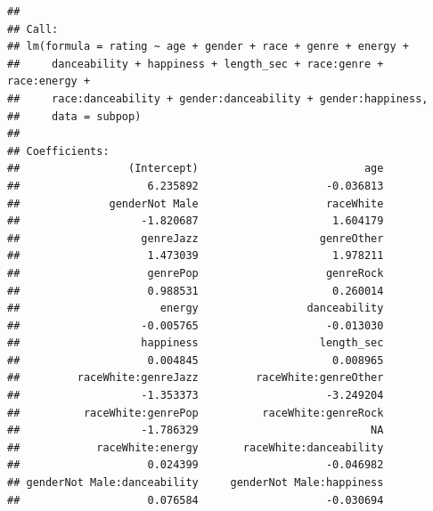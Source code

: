 \documentclass[
]{article}
\newenvironment{Shaded}{\begin{snugshade}}{\end{snugshade}}
\newcommand{\NormalTok}[1]{#1}
\newcommand{\OtherTok}[1]{\textcolor[rgb]{0.56,0.35,0.01}{#1}}
\newcommand{\SpecialCharTok}[1]{\textcolor[rgb]{0.81,0.36,0.00}{\textbf{#1}}}
\newcommand{\StringTok}[1]{\textcolor[rgb]{0.31,0.60,0.02}{#1}}
\begin{document}
\begin{Shaded}
\end{Shaded}

\begin{verbatim}
## 
## Call:
## lm(formula = rating ~ age + gender + race + genre + energy + 
##     danceability + happiness + length_sec + race:genre + race:energy + 
##     race:danceability + gender:danceability + gender:happiness, 
##     data = subpop)
## 
## Coefficients:
##                 (Intercept)                          age  
##                    6.235892                    -0.036813  
##              genderNot Male                    raceWhite  
##                   -1.820687                     1.604179  
##                   genreJazz                   genreOther  
##                    1.473039                     1.978211  
##                    genrePop                    genreRock  
##                    0.988531                     0.260014  
##                      energy                 danceability  
##                   -0.005765                    -0.013030  
##                   happiness                   length_sec  
##                    0.004845                     0.008965  
##         raceWhite:genreJazz         raceWhite:genreOther  
##                   -1.353373                    -3.249204  
##          raceWhite:genrePop          raceWhite:genreRock  
##                   -1.786329                           NA  
##            raceWhite:energy       raceWhite:danceability  
##                    0.024399                    -0.046982  
## genderNot Male:danceability     genderNot Male:happiness  
##                    0.076584                    -0.030694
\end{verbatim}
\end{document}
